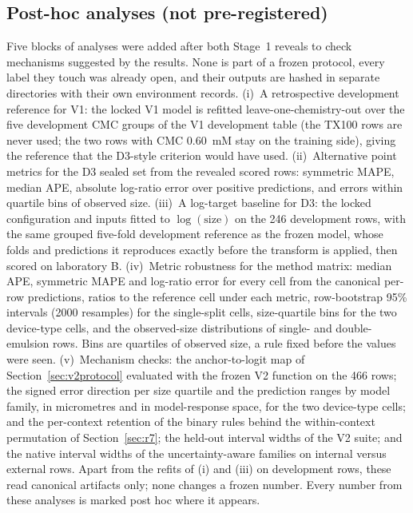 \documentclass[11pt,a4paper]{article}
\newcommand{\tox}{TX100}
\begin{document}
\subsection{Post-hoc analyses (not pre-registered)}
\label{sec:posthoc}
Five blocks of analyses were added after both Stage~1 reveals to check
mechanisms suggested by the results. None is part of a frozen protocol, every label they touch was already open, and
their outputs are hashed in separate directories with their own environment
records. (i)~A retrospective development reference for V1:
the locked V1 model is refitted leave-one-chemistry-out over the five
development CMC groups of the V1 development table (the \tox{} rows are never
used; the two rows with CMC 0.60~mM stay on the training side), giving the reference that the D3-style criterion would have used.
(ii)~Alternative point metrics for the D3 sealed set from the revealed scored
rows: symmetric MAPE, median APE, absolute log-ratio error over positive
predictions, and errors within quartile bins of observed size. (iii)~A
log-target baseline for D3: the locked configuration and inputs fitted to
$\log(\mathrm{size})$ on the 246 development rows, with the same grouped
five-fold development reference as the frozen model, whose folds and
predictions it reproduces exactly before the transform is applied, then
scored on laboratory B. (iv)~Metric robustness for the method matrix: median
APE, symmetric MAPE and log-ratio error for every cell from the canonical
per-row predictions, ratios to the reference cell under each metric,
row-bootstrap 95\% intervals (2000 resamples) for the single-split cells,
size-quartile bins for the two device-type cells, and the observed-size
distributions of single- and double-emulsion rows. Bins are quartiles of
observed size, a rule fixed before the values were seen. (v)~Mechanism
checks: the anchor-to-logit map of Section~\ref{sec:v2protocol} evaluated
with the frozen V2 function on the 466 rows; the signed error direction per
size quartile and the prediction ranges by model family, in micrometres and
in model-response space, for the two device-type cells; and the per-context
retention of the binary rules behind the within-context permutation of
Section~\ref{sec:r7}; the held-out interval widths of the V2 suite; and the
native interval widths of the uncertainty-aware families on internal versus
external rows. Apart from the refits of (i) and (iii) on development rows,
these read canonical artifacts only; none changes a frozen number. Every number from these analyses is marked post hoc
where it appears.
\end{document}
